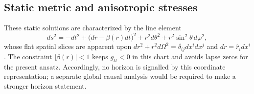 \documentclass[11pt]{article}
\begin{document}
\subsection{Static metric and anisotropic stresses}
These static solutions are characterized by the line element
\begin{equation}
\label{eq:static-metric}
ds^2 = -dt^2 + \bigl(dr-\beta(r)dt\bigr)^2 + r^2d\theta^2 + r^2\sin^2\theta\, d\varphi^2,
\end{equation}
whose flat spatial slices are apparent upon $dr^2+r^2d\Omega^2=\delta_{ij}dx^idx^j$ and $dr=\hat r_i dx^i$. The constraint $|\beta(r)| < 1$ keeps $g_{tt}<0$ in this chart and avoids lapse zeros for the present ansatz. Accordingly, no horizon is signalled by this coordinate representation; a separate global causal analysis would be required to make a stronger horizon statement.
\end{document}

